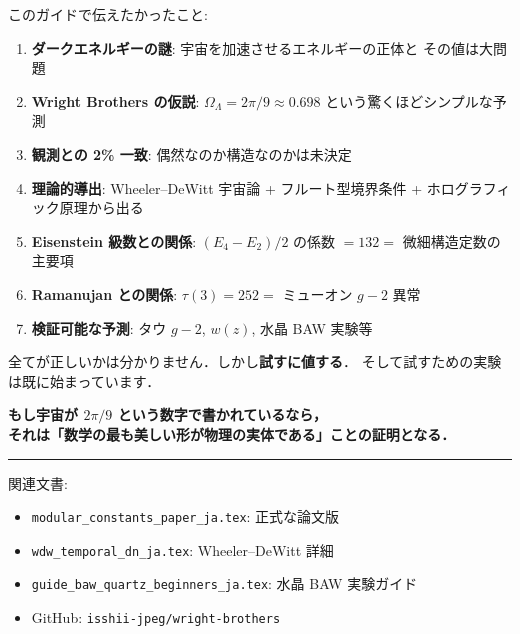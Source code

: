 \documentclass[11pt,a4paper]{article}
\begin{document}
このガイドで伝えたかったこと:

\begin{enumerate}
\item \textbf{ダークエネルギーの謎}: 宇宙を加速させるエネルギーの正体と
その値は大問題
\item \textbf{Wright Brothers の仮説}: $\Omega_\Lambda = 2\pi/9 \approx 0.698$
という驚くほどシンプルな予測
\item \textbf{観測との 2\% 一致}: 偶然なのか構造なのかは未決定
\item \textbf{理論的導出}: Wheeler--DeWitt 宇宙論 + フルート型境界条件 +
ホログラフィック原理から出る
\item \textbf{Eisenstein 級数との関係}: $(E_4 - E_2)/2$ の係数 $= 132 =$
微細構造定数の主要項
\item \textbf{Ramanujan との関係}: $\tau(3) = 252 = $ ミューオン $g-2$ 異常
\item \textbf{検証可能な予測}: タウ $g-2$, $w(z)$, 水晶 BAW 実験等
\end{enumerate}

全てが正しいかは分かりません．しかし\textbf{試すに値する}．
そして試すための実験は既に始まっています．

\vspace{2em}
\begin{center}
\Large
\textbf{もし宇宙が $2\pi/9$ という数字で書かれているなら，\\
それは「数学の最も美しい形が物理の実体である」ことの証明となる．}
\end{center}

\vspace{2em}
\hrule
\vspace{0.5em}
\small
\noindent
関連文書:
\begin{itemize}
\item \texttt{modular\_constants\_paper\_ja.tex}: 正式な論文版
\item \texttt{wdw\_temporal\_dn\_ja.tex}: Wheeler--DeWitt 詳細
\item \texttt{guide\_baw\_quartz\_beginners\_ja.tex}: 水晶 BAW 実験ガイド
\item GitHub: \texttt{isshii-jpeg/wright-brothers}
\end{itemize}
\end{document}
